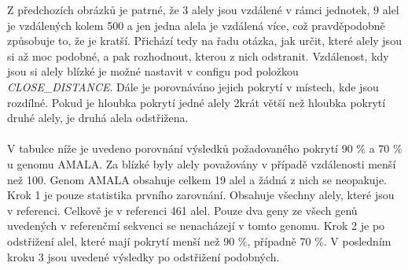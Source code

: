\documentclass[czech,DP]{thesiskiv}
\numberwithin{equation}{section}
\begin{document}
\noindent
Z předchozích obrázků je patrné, že 3 alely jsou vzdálené v rámci jednotek, 9 alel je vzdálených kolem 500 a jen jedna alela je vzdálená více, což pravděpodobně způsobuje to, že je kratší. Přichází tedy na řadu otázka, jak určit, které alely jsou si až moc podobné, a pak rozhodnout, kterou z nich odstranit. Vzdálenost, kdy jsou si alely blízké je možné nastavit v configu pod položkou \textit{CLOSE\_DISTANCE}. Dále je porovnáváno jejich pokrytí v místech, kde jsou rozdílné. Pokud je hloubka pokrytí jedné alely 2krát větší než hloubka pokrytí druhé alely, je druhá alela odstřižena.
\\
\\
V tabulce níže je uvedeno porovnání výsledků požadovaného pokrytí 90 \% a 70 \% u genomu AMALA. Za blízké byly alely považovány v případě vzdálenosti menší než 100. Genom AMALA obsahuje celkem 19 alel a žádná z nich se neopakuje. Krok 1 je pouze statistika prvního zarovnání. Obsahuje všechny alely, které jsou v referenci. Celkově je v referenci 461 alel. Pouze dva geny ze všech genů uvedených v referenčmí sekvenci se nenacházejí v tomto genomu. Krok 2 je po odstřižení alel, které mají pokrytí menší než 90 \%, případně 70 \%. V posledním kroku 3 jsou uvedené výsledky po odstřižení podobných. 
\\
\\
\end{document}
